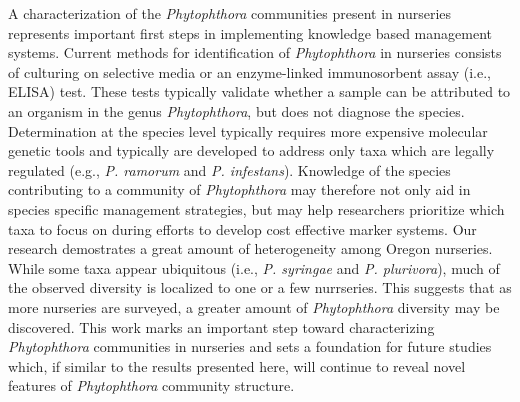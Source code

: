 \documentclass[12pt]{article}
\begin{document}

% 









A characterization of the \emph{Phytophthora} communities present in nurseries represents important first steps in implementing knowledge based management systems.  Current methods for identification of \emph{Phytophthora} in nurseries consists of culturing on selective media \cite{jeffers_martin_1986} or an enzyme-linked immunosorbent assay (i.e., ELISA) test.  These tests typically validate whether a sample can be attributed to an organism in the genus \emph{Phytophthora}, but does not diagnose the species.  Determination at the species level typically requires more expensive molecular genetic tools \cite{grunwald_etal_2011} and typically are developed to address only taxa which are legally regulated (e.g., \emph{P. ramorum} and \emph{P. infestans}).  Knowledge of the species contributing to a community of \emph{Phytophthora} may therefore not only aid in species specific management strategies, but may help researchers prioritize which taxa to focus on during efforts to develop cost effective marker systems.  Our research demostrates a great amount of heterogeneity among Oregon nurseries.  While some taxa appear ubiquitous (i.e., \emph{P. syringae} and \emph{P. plurivora}), much of the observed diversity is localized to one or a few nurrseries.  This suggests that as more nurseries are surveyed, a greater amount of \emph{Phytophthora} diversity may be discovered.  This work marks an important step toward characterizing \emph{Phytophthora} communities in nurseries and sets a foundation for future studies which, if similar to the results presented here, will continue to reveal novel features of \emph{Phytophthora} community structure.
\end{document}
